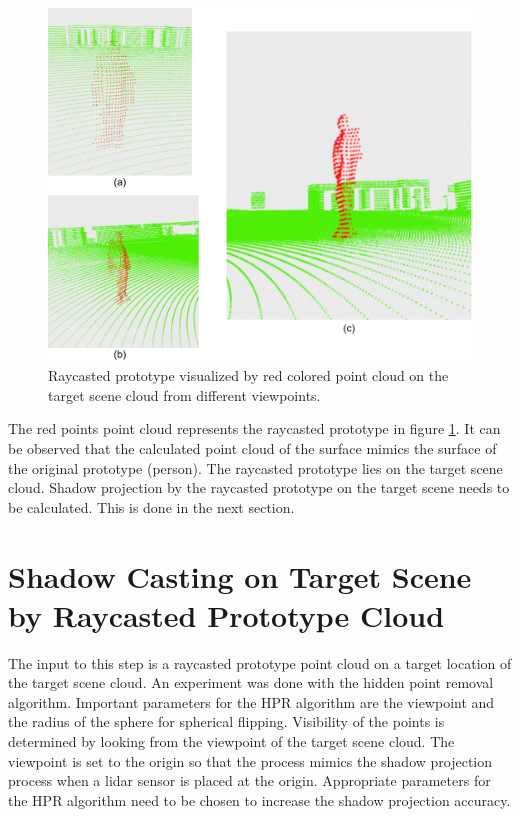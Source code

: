 \begin{figure}[htbp]
    \centering
    \includegraphics[width=1\linewidth]{97_graphics/results/raycasted_prototype.pdf}
    \caption{Raycasted prototype visualized by red colored point cloud on the target scene cloud from different viewpoints.}
    \label{fig:result-raycasted_prototype}
\end{figure}

The red points point cloud represents the raycasted prototype in figure \ref{fig:result-raycasted_prototype}. It can be observed that the calculated point cloud of the surface mimics the surface of the original prototype (person). The raycasted prototype lies on the target scene cloud. Shadow projection by the raycasted prototype on the target scene needs to be calculated. This is done in the next section.

\section{Shadow Casting on Target Scene by Raycasted Prototype Cloud}
The input to this step is a raycasted prototype point cloud on a target location of the target scene cloud. An experiment was done with the hidden point removal algorithm. Important parameters for the HPR algorithm are the viewpoint and the radius of the sphere for spherical flipping. Visibility of the points is determined by looking from the viewpoint of the target scene cloud. The viewpoint is set to the origin so that the process mimics the shadow projection process when a lidar sensor is placed at the origin. Appropriate parameters for the HPR algorithm need to be chosen to increase the shadow projection accuracy. 


